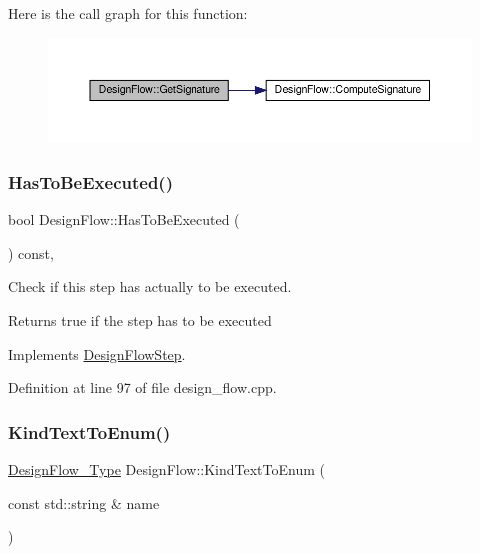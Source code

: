 Here is the call graph for this function\+:
\nopagebreak
\begin{figure}[H]
\begin{center}
\leavevmode
\includegraphics[width=350pt]{d2/d61/classDesignFlow_a0cfc751e3c286071ffb473e1165e1f46_cgraph}
\end{center}
\end{figure}
\mbox{\label{classDesignFlow_ac0c4f316f0ecf8f3b4a040e0a700616c}} 
\subsubsection{\texorpdfstring{Has\+To\+Be\+Executed()}{HasToBeExecuted()}}
{\footnotesize\ttfamily bool Design\+Flow\+::\+Has\+To\+Be\+Executed (\begin{DoxyParamCaption}{ }\end{DoxyParamCaption}) const\hspace{0.3cm}{\ttfamily [override]}, {\ttfamily [virtual]}}



Check if this step has actually to be executed. 

\begin{DoxyReturn}{Returns}
true if the step has to be executed 
\end{DoxyReturn}


Implements \hyperlink{classDesignFlowStep_a1783abe0c1d162a52da1e413d5d1ef05}{Design\+Flow\+Step}.



Definition at line 97 of file design\+\_\+flow.\+cpp.

\mbox{\label{classDesignFlow_a489bafa0366d812deb15424b54d822c9}} 
\subsubsection{\texorpdfstring{Kind\+Text\+To\+Enum()}{KindTextToEnum()}}
{\footnotesize\ttfamily \hyperlink{design__flow_8hpp_a0701ad2cbf08dc97b38caee3bbbff0c0}{Design\+Flow\+\_\+\+Type} Design\+Flow\+::\+Kind\+Text\+To\+Enum (\begin{DoxyParamCaption}\item[{const std\+::string \&}]{name }\end{DoxyParamCaption})\hspace{0.3cm}{\ttfamily [static]}}



